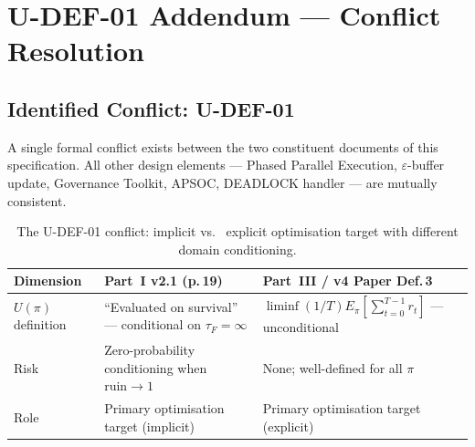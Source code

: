 
\chapter{U-DEF-01 Addendum --- Conflict Resolution}
\label{ch:u-def-01}


\section{Identified Conflict: U-DEF-01}
\label{sec:u-def-01-conflict}

A single formal conflict exists between the two constituent
documents of this specification. All other design elements ---
Phased Parallel Execution, $\varepsilon$-buffer update, Governance
Toolkit, APSOC, DEADLOCK handler --- are mutually consistent.

\begin{table}[ht]
\centering
\small
\begin{tabularx}{\linewidth}{lXX}
\toprule
\textbf{Dimension} & \textbf{Part~I v2.1 (p.\,19)} & \textbf{Part~III / v4 Paper Def.\,3} \\
\midrule

$U(\pi)$ definition
& ``Evaluated on survival'' --- conditional on $\tau_F = \infty$
& $\liminf (1/T) E_\pi[\sum_{t=0}^{T-1} r_t]$ --- unconditional \\

Risk
& Zero-probability conditioning when $\mathrm{ruin} \to 1$
& None; well-defined for all $\pi$ \\

Role
& Primary optimisation target (implicit)
& Primary optimisation target (explicit) \\

\bottomrule
\end{tabularx}
\caption[U-DEF-01 conflict]{The U-DEF-01 conflict: implicit vs.~
explicit optimisation target with different domain conditioning.}
\label{tab:u-def-01-conflict}
\end{table}

